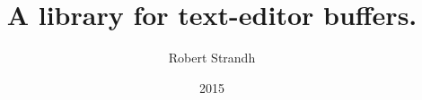 \documentclass[11pt]{book}
\title{{\Huge \sysname{}}\\
A library for text-editor buffers.}
\author{Robert Strandh}
\date{2015}
\def\inputtex#1{}
\begin{document}

\maketitle

\newpage

{\setlength{\parskip}{0cm}
\tableofcontents}

\inputtex{chap-intro.tex}
\inputtex{chap-external-protocols.tex}
\inputtex{chap-representation.tex}

{}


\printindex
\end{document}

